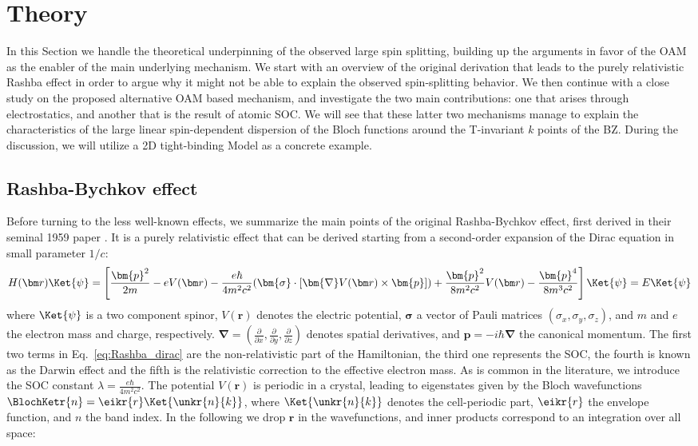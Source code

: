 \section{Theory \label{sec:Rashba_Theory}}
In this Section we handle the theoretical underpinning of the observed large spin splitting, building up the arguments in favor of the \gls{OAM} as the enabler of the main underlying mechanism.
We start with an overview of the original derivation that leads to the purely relativistic Rashba effect in order to argue why it might not be able to explain the observed spin-splitting behavior.
We then continue with a close study on the proposed alternative \gls{OAM} based mechanism, and investigate the two main contributions: one that arises through electrostatics, and another that is the result of atomic \gls{SOC}.
We will see that these latter two mechanisms manage to explain the characteristics of the large linear spin-dependent dispersion of the Bloch functions around the \gls{T}-invariant $k$ points of the \gls{BZ}.
During the discussion, we will utilize a 2D tight-binding Model as a concrete example.

\subsection{Rashba-Bychkov effect \label{sec:Rashba_relativistic}}
Before turning to the less well-known effects, we summarize the main points of the original Rashba-Bychkov effect, first derived in their seminal 1959 paper \cite{Rashba1959SymmetryAr}.
It is a purely relativistic effect that can be derived starting from a second-order expansion of the Dirac equation in small parameter $1/c$:
\begin{equation}
	\label{eq:Rashba_dirac}
	H(\bm r) \Ket{\psi} = \left[\frac{\bm{p}^2}{2m} - e V(\bm r) - \frac{e \hbar}{4m^2c^2}(\bm{\sigma}\cdot[\bm{\nabla}V(\bm r) \times \bm{p}]) + \frac{\bm{p}^2}{8m^2c^2} V(\bm r) - \frac{\bm{p}^4}{8m^3c^2}\right]\Ket{\psi} = E\Ket{\psi}
\end{equation}
where $\Ket{\psi}$ is a two component spinor, $V(\bm r)$ denotes the electric potential, $\bm{\sigma}$ a vector of Pauli matrices $(\sigma_x, \sigma_y, \sigma_z)$, and $m$ and $e$ the electron mass and charge, respectively.
$\bm \nabla = (\frac{\partial}{\partial x}, \frac{\partial}{\partial y}, \frac{\partial }{\partial z})$ denotes spatial derivatives, and $\bm{p} = -i\hbar \bm{\nabla}$ the canonical momentum.
The first two terms in Eq.~\eqref{eq:Rashba_dirac} are the non-relativistic part of the Hamiltonian, the third one represents the \gls{SOC}, the fourth is known as the Darwin effect and the fifth is the relativistic correction to the effective electron mass. 
As is common in the literature, we introduce the \gls{SOC} constant $\lambda = \frac{e \hbar}{4m^2c^2}$.
The potential $V(\bm r)$ is periodic in a crystal, leading to eigenstates given by the Bloch wavefunctions $\BlochKetr{n} = \eikr{r} \Ket{\unkr{n}{k}}$, where $\Ket{\unkr{n}{k}}$ denotes the cell-periodic part, $\eikr{r}$ the envelope function, and $n$ the band index.
In the following we drop $\bm{r}$ in the wavefunctions, and inner products correspond to an integration over all space:

